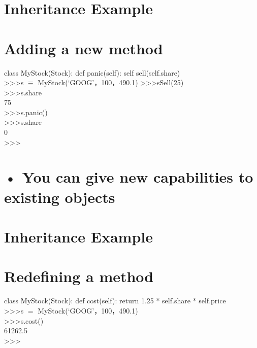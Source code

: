 \documentclass[
  letterpaper,
  DIV=11,
  numbers=noendperiod]{scrreprt}
\begin{document}

\chapter{Inheritance Example}\label{inheritance-example}


\chapter{Adding a new method}\label{adding-a-new-method}

class MyStock(Stock): def panic(self): self sell(self.share)\\
\textgreater\textgreater\textgreater s \(\equiv\)
MyStock(`GOOG'，100，490.1)
\textgreater\textgreater\textgreater sSell(25)\\
\textgreater\textgreater\textgreater s.share\\
75\\
\textgreater\textgreater\textgreater s.panic()\\
\textgreater\textgreater\textgreater s.share\\
0\\
\textgreater\textgreater\textgreater{}


\chapter{• You can give new capabilities to existing
objects}\label{you-can-give-new-capabilities-to-existing-objects}


\chapter{Inheritance Example}\label{inheritance-example-1}


\chapter{Redefining a method}\label{redefining-a-method}

class MyStock(Stock): def cost(self): return 1.25 * self.share *
self.price\\
\textgreater\textgreater\textgreater s \(=\)
MyStock(`GOOG'，100，490.1)\\
\textgreater\textgreater\textgreater s.cost()\\
61262.5\\
\textgreater\textgreater\textgreater{}
\end{document}
